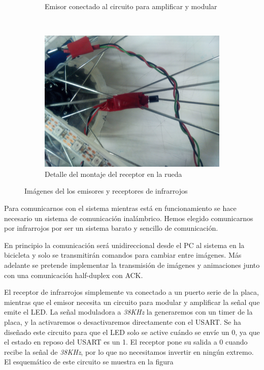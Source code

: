 \begin{figure}[!ht]
\begin{subfigure}[t]{0.4\textwidth}
		\caption{Emisor conectado al circuito para amplificar y
		modular}
		\label{fig:comunicacion-emisor}
	\end{subfigure}
	\\
	\begin{subfigure}[t]{0.5\textwidth}
		\centering
		\includegraphics[width=\textwidth]{images/comunicacion-montaje}
		\caption{Detalle del montaje del receptor en la rueda}
		\label{fig:comunicacion-montaje}
	\end{subfigure}

	\caption{Imágenes del los emisores y receptores de infrarrojos}
	\label{fig:comunicacion}
\end{figure}

Para comunicarnos con el sistema mientras está en funcionamiento se hace
necesario un sistema de comunicación inalámbrico. Hemos elegido comunicarnos por
infrarrojos por ser un sistema barato y sencillo de comunicación.

En principio la comunicación será unidireccional desde el PC al sistema en la
bicicleta y solo se transmitirán comandos para cambiar entre imágenes. Más
adelante se pretende implementar la transmisión de imágenes y animaciones junto
con una comunicación half-duplex con ACK.

El receptor de infrarrojos simplemente va conectado a un puerto serie de la
placa, mientras que el emisor necesita un circuito para modular y amplificar la
señal que emite el LED. La señal moduladora a \textsl{38KHz} la generaremos con un
timer de la placa, y la activaremos o desactivaremos directamente con el USART.
Se ha diseñado este circuito para que el LED solo se active cuándo se envíe un
0, ya que el estado en reposo del USART es un 1. El receptor pone su salida a 0
cuando recibe la señal de \textsl{38KHz}, por lo que no necesitamos invertir en ningún
extremo. El esquemático de este circuito se muestra en la figura


